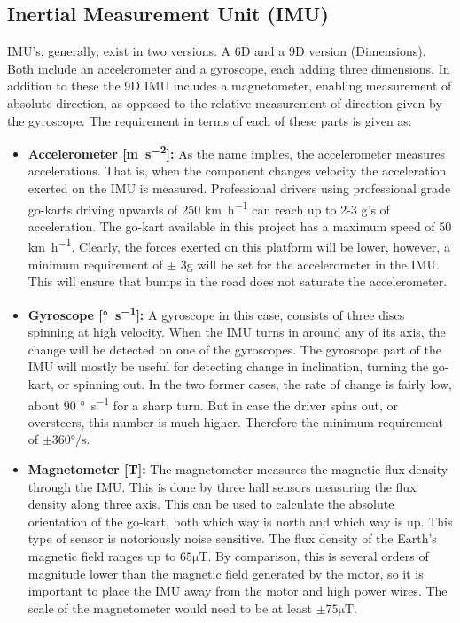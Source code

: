 \subsection{Inertial Measurement Unit (IMU)}
\label{sec:imu}
IMU's, generally, exist in two versions.
A 6D and a 9D version (Dimensions).
Both include an accelerometer and a gyroscope, each adding three dimensions.
In addition to these the 9D IMU includes a magnetometer, enabling measurement of absolute direction, as opposed to the relative measurement of direction given by the gyroscope.
The requirement in terms of each of these parts is given as:
\begin{itemize}
	\item \textbf{Accelerometer [\si{\metre\per\second^2}]:} As the name implies, the accelerometer measures accelerations.
	That is, when the component changes velocity the acceleration exerted on the IMU is measured.
	Professional drivers using professional grade go-karts driving upwards of 250 \si{\kilo\metre\per\hour} can reach up to 2-3 g's of acceleration.
	The go-kart available in this project has a maximum speed of 50 \si{\kilo\metre\per\hour}.
	Clearly, the forces exerted on this platform will be lower, however, a minimum requirement of $\pm$ 3g will be set for the accelerometer in the IMU.
	This will ensure that bumps in the road does not saturate the accelerometer.
	\item \textbf{Gyroscope [\si{\degree\per\second}]:} 
	A gyroscope in this case, consists of three discs spinning at high velocity.
	When the IMU turns in around any of its axis, the change will be detected on one of the gyroscopes. 
	The gyroscope part of the IMU will mostly be useful for detecting change in inclination, turning the go-kart, or spinning out.
	In the two former cases, the rate of change is fairly low, about 90 \si{\degree\per\second} for a sharp turn. 
	But in case the driver spins out, or oversteers, this number is much higher. 
	Therefore the minimum requirement of $\pm 360 \si{\degree\per\second}$.
	\item \textbf{Magnetometer [\si{\tesla}]:} 
	The magnetometer measures the magnetic flux density through the IMU.
	This is done by three hall sensors measuring the flux density along three axis. 
	This can be used to calculate the absolute orientation of the go-kart, both which way is north and which way is up.
	This type of sensor is notoriously noise sensitive.
	The flux density of the Earth's magnetic field\cite{earth_magnetic} ranges up to $65 \si{\micro\tesla}$.
	By comparison, this is several orders of magnitude lower than the magnetic field generated by the motor, so it is important to place the IMU away from the motor and high power wires.
	The scale of the magnetometer would need to be at least $\pm 75 \si{\micro \tesla}$.
\end{itemize}

